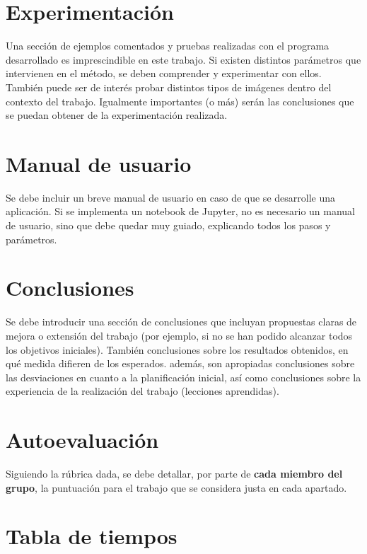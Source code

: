 \documentclass[a4paper]{article}
\begin{document}
\section{Experimentación}

Una sección de ejemplos comentados y pruebas realizadas con el programa desarrollado es imprescindible en este trabajo. Si existen distintos parámetros que intervienen en el método, se deben comprender y experimentar con ellos. También puede ser de interés probar distintos tipos de imágenes dentro del contexto del trabajo. Igualmente importantes (o más) serán las conclusiones que se puedan obtener de la experimentación realizada. 


\section{Manual de usuario}

Se debe incluir un breve manual de usuario en caso de que se desarrolle una aplicación. Si se implementa un notebook de Jupyter, no es necesario un manual de usuario, sino que debe quedar muy guiado, explicando todos los pasos y parámetros.  

\section{Conclusiones}

Se debe introducir una sección de conclusiones que incluyan propuestas claras de mejora o extensión del trabajo (por ejemplo, si no se han podido alcanzar todos los objetivos iniciales). También conclusiones sobre los resultados obtenidos, en qué medida difieren de los esperados. además, son apropiadas conclusiones sobre las desviaciones en cuanto a la planificación inicial, así como conclusiones sobre la experiencia de la realización del trabajo (lecciones aprendidas).

\section{Autoevaluación}

Siguiendo la rúbrica dada, se debe detallar, por parte de  \textbf{cada miembro del grupo}, la puntuación para el trabajo que se considera justa en cada apartado. 

\section{Tabla de tiempos}
\end{document}
